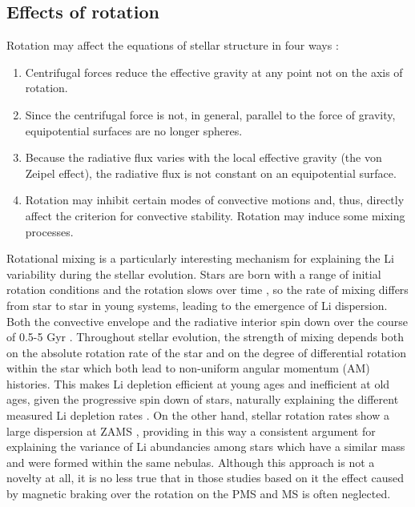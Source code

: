 \documentclass[fleqn,usenatbib]{mnras}
\begin{document}
\subsection{Effects of rotation}
Rotation may affect the equations of stellar structure in four ways \citep{Endal1976}:
\begin{enumerate}
    \item Centrifugal forces reduce the effective gravity at any point not on the axis of rotation.
    \item Since the centrifugal force is not, in general, parallel to the force of gravity, equipotential surfaces are no longer spheres.
    \item Because the radiative flux varies with the local effective gravity (the von Zeipel effect), the radiative flux is not constant on an equipotential surface.
    \item Rotation may inhibit certain modes of convective motions and, thus, directly affect the criterion for convective stability. Rotation may induce some mixing processes.
\end{enumerate}

Rotational mixing is a particularly interesting mechanism for explaining the Li variability during the stellar evolution. Stars are born with a range of initial rotation conditions and the rotation slows over time \citep{Skumanich1972}, so the rate of mixing differs from star to star in young systems, leading to the emergence of Li dispersion. Both the convective envelope and the radiative interior spin down over the course of 0.5-5 Gyr \citep{Somers2014a}. Throughout stellar evolution, the strength of mixing depends both on the absolute rotation rate of the star and on the degree of differential rotation within the star which both lead to non-uniform angular momentum (AM) histories. This makes Li depletion efficient at young ages and inefficient at old ages, given the progressive spin down of stars, naturally explaining the different measured Li depletion rates \citep{Sestito2005}. On the other hand, stellar rotation rates show a large dispersion at ZAMS \citep{Stauffer1984}, providing in this way a consistent argument for explaining the variance of Li abundancies among stars which have a similar mass and were formed within the same nebulas. Although this approach is not a novelty at all, it is no less true that in those studies based on it the effect caused by magnetic braking over the rotation on the PMS and MS is often neglected. \par
\end{document}
